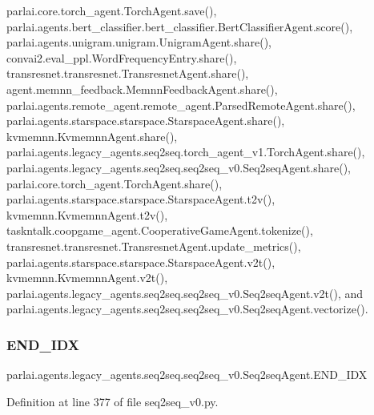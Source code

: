 parlai.\+core.\+torch\+\_\+agent.\+Torch\+Agent.\+save(), parlai.\+agents.\+bert\+\_\+classifier.\+bert\+\_\+classifier.\+Bert\+Classifier\+Agent.\+score(), parlai.\+agents.\+unigram.\+unigram.\+Unigram\+Agent.\+share(), convai2.\+eval\+\_\+ppl.\+Word\+Frequency\+Entry.\+share(), transresnet.\+transresnet.\+Transresnet\+Agent.\+share(), agent.\+memnn\+\_\+feedback.\+Memnn\+Feedback\+Agent.\+share(), parlai.\+agents.\+remote\+\_\+agent.\+remote\+\_\+agent.\+Parsed\+Remote\+Agent.\+share(), parlai.\+agents.\+starspace.\+starspace.\+Starspace\+Agent.\+share(), kvmemnn.\+Kvmemnn\+Agent.\+share(), parlai.\+agents.\+legacy\+\_\+agents.\+seq2seq.\+torch\+\_\+agent\+\_\+v1.\+Torch\+Agent.\+share(), parlai.\+agents.\+legacy\+\_\+agents.\+seq2seq.\+seq2seq\+\_\+v0.\+Seq2seq\+Agent.\+share(), parlai.\+core.\+torch\+\_\+agent.\+Torch\+Agent.\+share(), parlai.\+agents.\+starspace.\+starspace.\+Starspace\+Agent.\+t2v(), kvmemnn.\+Kvmemnn\+Agent.\+t2v(), taskntalk.\+coopgame\+\_\+agent.\+Cooperative\+Game\+Agent.\+tokenize(), transresnet.\+transresnet.\+Transresnet\+Agent.\+update\+\_\+metrics(), parlai.\+agents.\+starspace.\+starspace.\+Starspace\+Agent.\+v2t(), kvmemnn.\+Kvmemnn\+Agent.\+v2t(), parlai.\+agents.\+legacy\+\_\+agents.\+seq2seq.\+seq2seq\+\_\+v0.\+Seq2seq\+Agent.\+v2t(), and parlai.\+agents.\+legacy\+\_\+agents.\+seq2seq.\+seq2seq\+\_\+v0.\+Seq2seq\+Agent.\+vectorize().

\mbox{\label{classparlai_1_1agents_1_1legacy__agents_1_1seq2seq_1_1seq2seq__v0_1_1Seq2seqAgent_a46ebee256e0812f6cab77a71c02578e0}} 
\subsubsection{\texorpdfstring{E\+N\+D\+\_\+\+I\+DX}{END\_IDX}}
{\footnotesize\ttfamily parlai.\+agents.\+legacy\+\_\+agents.\+seq2seq.\+seq2seq\+\_\+v0.\+Seq2seq\+Agent.\+E\+N\+D\+\_\+\+I\+DX}



Definition at line 377 of file seq2seq\+\_\+v0.\+py.



